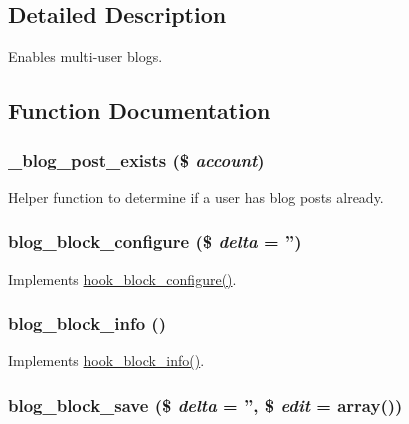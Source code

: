 \subsection{Detailed Description}
Enables multi-\/user blogs. 

\subsection{Function Documentation}
\hypertarget{blog_8module_a7603ad9be5af15eb4a46dec8a4156cf3}{
\subsubsection[{\_\-blog\_\-post\_\-exists}]{\setlength{\rightskip}{0pt plus 5cm}\_\-blog\_\-post\_\-exists (\$ {\em account})}}
\label{blog_8module_a7603ad9be5af15eb4a46dec8a4156cf3}
Helper function to determine if a user has blog posts already. \hypertarget{blog_8module_ad5210eabd038ec5b68563d6501125c6e}{
\subsubsection[{blog\_\-block\_\-configure}]{\setlength{\rightskip}{0pt plus 5cm}blog\_\-block\_\-configure (\$ {\em delta} = {\ttfamily ''})}}
\label{blog_8module_ad5210eabd038ec5b68563d6501125c6e}
Implements \hyperlink{group__hooks_gacc86fefd1e0299f387f79a37dd1a48b7}{hook\_\-block\_\-configure()}. \hypertarget{blog_8module_a195ee731f64b9c90d54d57ba9a3c3616}{
\subsubsection[{blog\_\-block\_\-info}]{\setlength{\rightskip}{0pt plus 5cm}blog\_\-block\_\-info ()}}
\label{blog_8module_a195ee731f64b9c90d54d57ba9a3c3616}
Implements \hyperlink{group__hooks_ga2bd926c3e90deeba0c3ba64fb3c64d73}{hook\_\-block\_\-info()}. \hypertarget{blog_8module_a7d6feb86f9fde964654130e26769181b}{
\subsubsection[{blog\_\-block\_\-save}]{\setlength{\rightskip}{0pt plus 5cm}blog\_\-block\_\-save (\$ {\em delta} = {\ttfamily ''}, \/  \$ {\em edit} = {\ttfamily array()})}}
